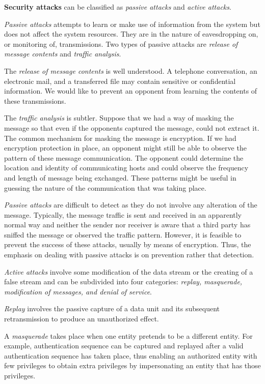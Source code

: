 	\textbf{Security attacks} can be classified as \textit{passive attacks} and \textit{active attacks}.

	\textit{Passive attacks} attempts to learn or make use of information from the system but does not affect the system resources.
	They are in the nature of eavesdropping on, or monitoring of, transmissions.
	Two types of passive attacks are \textit{release of message contents} and \textit{traffic analysis}.

	The \textit{release of message contents} is well understood. 
	A telephone conversation, an electronic mail, and a transferred file may contain sensitive or confidential information.
	We would like to prevent an opponent from learning the contents of these transmissions.

	The \textit{traffic analysis} is subtler. 
	Suppose that we had a way of masking the message so that even if the  opponents captured the message, could not extract it.
	The common mechanism for masking the message is encryption.
	If we had encryption protection in place, an opponent might still be able to observe the pattern of these message communication.
	The opponent could determine the location and identity of communicating hosts and could observe the frequency and length of message being exchanged.
	These patterns might be useful in guessing the nature of the communication that was taking place.

	\textit{Passive attacks} are difficult to detect as they do not involve any alteration of the message.
	Typically, the message traffic is sent and received in an apparently normal way and neither the sender nor receiver is aware that a third party has sniffed the message or observed the traffic pattern.
	However, it is feasible to prevent the success of these attacks, usually by means of encryption. 
	Thus, the emphasis on dealing with passive attacks is on prevention rather that detection.

	\textit{Active attacks} involve some modification of the data stream or the creating of a false stream and can be subdivided into four categories: \textit{replay, masquerade, modification of messages, and denial of service}.

	\textit{Replay} involves the passive capture of a data unit and its subsequent retransmission to produce an unauthorized effect.

	A \textit{masquerade} takes place when one entity pretends to be a different entity.
	For example, authentication sequence can be captured and replayed after a valid authentication sequence has taken place, thus enabling an authorized entity with few privileges to obtain extra privileges by impersonating an entity that has those privileges.

